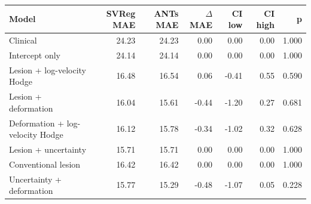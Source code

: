 \begin{tabular}{lrrrrrr}
\toprule
Model & SVReg MAE & ANTs MAE & $\Delta$MAE & CI low & CI high & p \\
\midrule
Clinical & 24.23 & 24.23 & 0.00 & 0.00 & 0.00 & 1.000 \\
Intercept only & 24.14 & 24.14 & 0.00 & 0.00 & 0.00 & 1.000 \\
Lesion + log-velocity Hodge & 16.48 & 16.54 & 0.06 & -0.41 & 0.55 & 0.590 \\
Lesion + deformation & 16.04 & 15.61 & -0.44 & -1.20 & 0.27 & 0.681 \\
Deformation + log-velocity Hodge & 16.12 & 15.78 & -0.34 & -1.02 & 0.32 & 0.628 \\
Lesion + uncertainty & 15.71 & 15.71 & 0.00 & 0.00 & 0.00 & 1.000 \\
Conventional lesion & 16.42 & 16.42 & 0.00 & 0.00 & 0.00 & 1.000 \\
Uncertainty + deformation & 15.77 & 15.29 & -0.48 & -1.07 & 0.05 & 0.228 \\
\bottomrule
\end{tabular}
